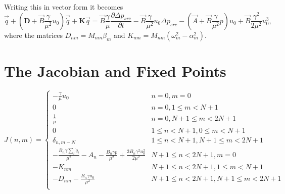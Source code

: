 \documentclass[superscriptaddress, onecolumn, prl]{revtex4}
\begin{document}
Writing this in vector form it becomes
\begin{equation}
\label{eq:viscous7}
\vec{\ddot{q}} + \left(\boldsymbol{D} + \vec{B} \frac{\gamma }{\mu^2} u_0 \right) \vec{\dot{q}} + \boldsymbol{K} \vec{q} =\vec{B} \frac{\gamma}{\mu} \frac{\partial \Delta p_{src}}{\partial t} -\vec{B} \frac{\gamma }{\mu^2} u_0 \Delta p_{src}  -\left(\vec{A} + \vec{B}  \frac{\gamma }{\mu^2}p \right) u_0 + \vec{B}  \frac{\gamma^2 }{2\mu^2} u_{0}^3,
\end{equation}  
where the matrices $D_{nm}=M_{nm} \beta_m$ and $K_{nm}=M_{nm} (\omega_m^2 - \alpha_m^2)$.
\section{The Jacobian and Fixed Points}
\begin{equation}
J(n,m) = \begin{cases}
-\frac{\gamma}{\mu} u_0 & n=0, m=0 \\
0 & n=0, 1 \leq m < N + 1 \\
\frac{1}{\mu} & n=0, N + 1 \leq m < 2 N +1 \\
0 & 1 \leq n < N+1, 0 \leq m < N+1 \\
\delta_{n,m-N} & 1 \leq n < N+1, N+1 \leq m < 2N+1 \\ 
-\frac{B_n \gamma \sum_l \dot{q}_l}{\mu^2} - A_n - \frac{B_n \gamma p }{\mu^2} + \frac{3 B_n \gamma^2 u_0^2}{2 \mu^2}  & N+1 \leq n < 2N+1, m=0\\
-K_{nm} & N+1 \leq n < 2N+1, 1 \leq m < N+1 \\
-D_{nm} - \frac{B_n \gamma u_0}{\mu^2} & N+1 \leq n < 2N+1, N+1 \leq m < 2N+1 \\

\end{cases}
\end{equation}
\end{document}
